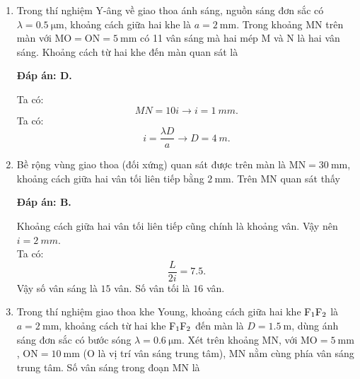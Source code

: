 \begin{enumerate}[label=\bfseries Câu \arabic*:]
{	}
	

	
	\item {} 
		\cauhoi
	{Trong thí nghiệm Y-âng về giao thoa ánh sáng, nguồn sáng đơn sắc có $\lambda=\SI{0.5}{\micro \meter}$, khoảng cách giữa hai khe là $a=\SI{2}{\milli \meter}$. Trong khoảng MN trên màn với $\text{MO}=\text{ON}=\SI{5}{\milli \meter}$ có 11 vân sáng mà hai mép M và N là hai vân sáng. Khoảng cách từ hai khe đến màn quan sát là
	}
	
	\loigiai
	{		\textbf{Đáp án: D.}
		
Ta có:
$$
	MN = 10i \rightarrow i = \SI{1}{mm}.
$$
Ta có:
$$
	i = \dfrac{\lambda D}{a} \rightarrow D = \SI{4}{m}.
$$
		
	}
	
\item {} 
		\cauhoi
	{Bề rộng vùng giao thoa (đối xứng) quan sát được trên màn là $\text{MN}=\SI{30}{\milli \meter}$, khoảng cách giữa hai vân tối liên tiếp bằng $\SI{2}{\milli \meter}$. Trên MN quan sát thấy 
	}
	
	\loigiai
	{		\textbf{Đáp án: B.}
		
Khoảng cách giữa hai vân tối liên tiếp cũng chính là khoảng vân. Vậy nên $ i = \SI{2}{mm} $. \\
Ta có:
$$
	\dfrac{L}{2i} = \num{7,5}.
$$
Vậy số vân sáng là $ 15 $ vân. Số vân tối là $ 16 $ vân.
	}
	
	\item {}
		\cauhoi
	{Trong thí nghiệm giao thoa khe Young, khoảng cách giữa hai khe $\text F _1 \text F_2$ là $a=\SI{2}{\milli \meter}$, khoảng cách từ hai khe $\text F_1 \text F_2$ đến màn là $D=\SI{1.5}{\meter}$, dùng ánh sáng đơn sắc có bước sóng $\lambda=\SI{0.6}{\micro \meter}$. Xét trên khoảng MN, với $\text{MO}=\SI{5}{\milli \meter}$, $\text{ON}=\SI{10}{\milli \meter}$ (O là vị trí vân sáng trung tâm), MN nằm cùng phía vân sáng trung tâm. Số vân sáng trong đoạn MN là
	}
	

\end{enumerate}
